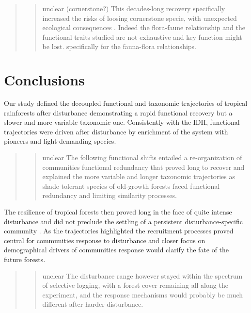 \documentclass[fleqn,10pt]{ArtEcoFoG} %
\theoremstyle{definition}
\theoremstyle{definition}
\theoremstyle{definition}
\theoremstyle{remark}
\begin{document}
\begin{quote}
\begin{quote}
unclear (cornerstone?) This decades-long recovery specifically increased
the risks of loosing cornerstone specie, with unexpected ecological
consequences \citep{Jones1994, Chazdon2003a, Diaz2005, Gardner2007}.
Indeed the flora-faune relationship and the functional traits studied
are not exhaustive and key function might be lost. specifically for the
fauna-flora relationships.
\end{quote}
\end{quote}

\section{Conclusions}\label{conclusions}

Our study defined the decoupled functional and taxonomic trajectories of
tropical rainforests after disturbance demonstrating a rapid functional
recovery but a slower and more variable taxonomic one. Consistently with
the IDH, functional trajectories were driven after disturbance by
enrichment of the system with pioneers and light-demanding species.

\begin{quote}
\begin{quote}
unclear The following functional shifts entailed a re-organization of
communities functional redundancy that proved long to recover and
explained the more variable and longer taxonomic trajectories as shade
tolerant species of old-growth forests faced functional redundancy and
limiting similarity processes.
\end{quote}
\end{quote}

The resilience of tropical forests then proved long in the face of quite
intense disturbance and did not preclude the settling of a persistent
disturbance-specific community \citep{Gourlet-Fleury2005}. As the
trajectories highlighted the recruitment processes proved central for
communities response to disturbance and closer focus on demographical
drivers of communities response would clarify the fate of the future
forests.

\begin{quote}
\begin{quote}
unclear The disturbance range however stayed within the spectrum of
selective logging, with a forest cover remaining all along the
experiment, and the response mechanisms would probably be much different
after harder disturbance.
\end{quote}
\end{quote}
\end{document}
